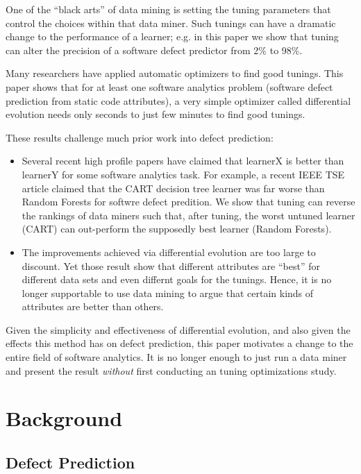 \documentclass{sig-alternative}
\newcommand{\bi}{\begin{itemize}[leftmargin=0.4cm]}
\newcommand{\ei}{\end{itemize}}
\begin{document}

One of the ``black arts'' of data mining is setting the tuning
parameters that control  the choices within that data miner.
Such tunings can have a dramatic change to the performance of a learner;
e.g. in this paper we show that tuning can alter the precision of
a software defect predictor from 2\% to 98\%.

Many researchers have applied automatic optimizers to find good tunings.
This paper shows that for at least one software analytics problem
(software defect prediction from static code attributes),   a
very simple optimizer called differential evolution needs only   seconds
to just  few minutes to find good tunings.  

These results   challenge much prior work into defect prediction:
\bi 
\item 
Several recent high profile papers have claimed 
that learnerX is better than learnerY for some software analytics task.
For example, a recent IEEE TSE article claimed that the 
CART decision tree learner was far worse than Random Forests for
softwre defect predition. 
We show that tuning can reverse the rankings of data miners such
that, after tuning, the worst untuned learner (CART) can out-perform the supposedly
best learner (Random Forests).
\item
The improvements achieved via differential evolution are too large to discount.
Yet those result show that different attributes are ``best'' for different
data sets and even differnt goals for the tunings. Hence, it is no longer
supportable to use data mining to argue that certain kinds of attributes
are better than others. 
\ei 
Given the simplicity and effectiveness of differential evolution,
and also given the effects this method has on defect prediction, this
paper  motivates  a change to the entire field of software analytics.
It is no longer enough to just run a data miner and present the result
{\em without} first conducting an tuning optimizations study.


\section{Background}
\subsection{Defect Prediction}
\end{document}

